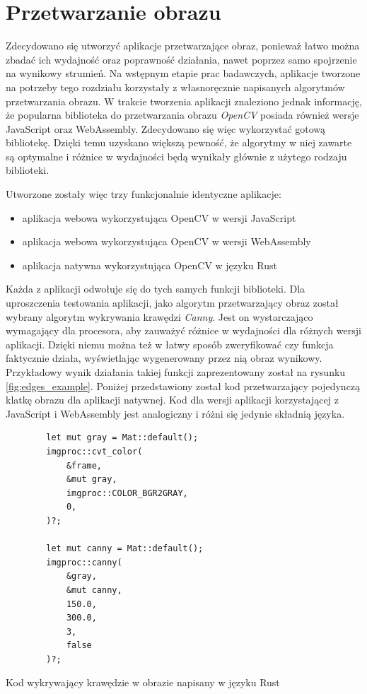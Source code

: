 \documentclass[language=polish,type=master]{aghmodern}
\begin{document}
\section{Przetwarzanie obrazu}
Zdecydowano się utworzyć aplikacje przetwarzające obraz, ponieważ łatwo można zbadać ich wydajność oraz poprawność działania, nawet poprzez samo spojrzenie na wynikowy strumień.
Na wstępnym etapie prac badawczych, aplikacje tworzone na potrzeby tego rozdziału korzystały z własnoręcznie napisanych algorytmów przetwarzania obrazu.
W trakcie tworzenia aplikacji znaleziono jednak informację, że popularna biblioteka do przetwarzania obrazu \emph{OpenCV}\footnotemark{} posiada również wersje JavaScript oraz WebAssembly.
Zdecydowano się więc wykorzystać gotową bibliotekę.
Dzięki temu uzyskano większą pewność, że algorytmy w niej zawarte są optymalne i różnice w wydajności będą wynikały głównie z użytego rodzaju biblioteki.

Utworzone zostały więc trzy funkcjonalnie identyczne aplikacje:
\begin{itemize}
    \item aplikacja webowa wykorzystująca OpenCV w wersji JavaScript
    \item aplikacja webowa wykorzystująca OpenCV w wersji WebAssembly
    \item aplikacja natywna wykorzystująca OpenCV w języku Rust
\end{itemize}

Każda z aplikacji odwołuje się do tych samych funkcji biblioteki.
Dla uproszczenia testowania aplikacji, jako algorytm przetwarzający obraz został wybrany algorytm wykrywania krawędzi \emph{Canny}\footnotemark{}.
Jest on wystarczająco wymagający dla procesora, aby zauważyć różnice w wydajności dla różnych wersji aplikacji.
Dzięki niemu można też w łatwy sposób zweryfikować czy funkcja faktycznie działa, wyświetlając wygenerowany przez nią obraz wynikowy.
Przykładowy wynik działania takiej funkcji zaprezentowany został na rysunku \ref{fig:edges_example}.
Poniżej przedstawiony został kod przetwarzający pojedynczą klatkę obrazu dla aplikacji natywnej.
Kod dla wersji aplikacji korzystającej z JavaScript i WebAssembly jest analogiczny i różni się jedynie składnią języka.

\begin{listing}[H]
    \begin{verbatim}
        let mut gray = Mat::default();
        imgproc::cvt_color(
            &frame,
            &mut gray,
            imgproc::COLOR_BGR2GRAY,
            0,
        )?;

        let mut canny = Mat::default();
        imgproc::canny(
            &gray,
            &mut canny,
            150.0,
            300.0,
            3,
            false
        )?;
    \end{verbatim}
    \caption{Kod wykrywający krawędzie w obrazie napisany w języku Rust}
\end{listing}
\end{document}
